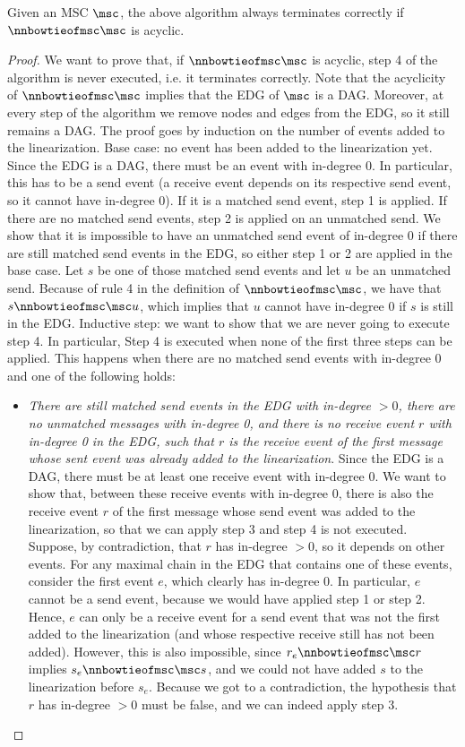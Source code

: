 \begin{proposition}
	Given an MSC $\msc$, the above algorithm always terminates correctly if $\nnbowtieofmsc\msc$ is acyclic.
\end{proposition}
\begin{proof}
We want to prove that, if $\nnbowtieofmsc\msc$ is acyclic, step 4 of the algorithm is never executed, i.e. it terminates correctly. Note that the acyclicity of $\nnbowtieofmsc\msc$ implies that the EDG of $\msc$ is a DAG. Moreover, at every step of the algorithm we remove nodes and edges from the EDG, so it still remains a DAG. The proof goes by induction on the number of events added to the linearization.\newline
Base case: no event has been added to the linearization yet. Since the EDG is a DAG, there must be an event with in-degree 0. In particular, this has to be a send event (a receive event depends on its respective send event, so it cannot have in-degree 0). If it is a matched send event, step 1 is applied. If there are no matched send events, step 2 is applied on an unmatched send. We show that it is impossible to have an unmatched send event of in-degree 0 if there are still matched send events in the EDG, so either step 1 or 2 are applied in the base case. Let $s$ be one of those matched send events and let $u$ be an unmatched send. Because of rule 4 in the definition of $\nnbowtieofmsc\msc$, we have that $s \nnbowtieofmsc\msc u$, which implies that $u$ cannot have in-degree 0 if $s$ is still in the EDG.\newline
Inductive step: we want to show that we are never going to execute step 4. In particular, Step 4 is executed when none of the first three steps can be applied. This happens when there are no matched send events with in-degree 0 and one of the following holds:
\begin{itemize}\itemsep=0.5ex
	\item \emph{There are still matched send events in the EDG with in-degree $>0$, there are no unmatched messages with in-degree 0, and there is no receive event $r$ with in-degree 0 in the EDG, such that $r$ is the receive event of the first message whose sent event was already added to the linearization}. Since the EDG is a DAG, there must be at least one receive event with in-degree 0. We want to show that, between these receive events with in-degree 0, there is also the receive event $r$ of the first message whose send event was added to the linearization, so that we can apply step 3 and step 4 is not executed. Suppose, by contradiction, that $r$ has in-degree $>0$, so it depends on other events. For any maximal chain in the EDG that contains one of these events, consider the first event $e$, which clearly has in-degree 0. In particular, $e$ cannot be a send event, because we would have applied step 1 or step 2. Hence, $e$ can only be a receive event for a send event that was not the first added to the linearization (and whose respective receive still has not been added). However, this is also impossible, since $r_e \nnbowtieofmsc\msc r$ implies $s_e \nnbowtieofmsc\msc s$, and we could not have added $s$ to the linearization before $s_e$. Because we got to a contradiction, the hypothesis that $r$ has in-degree $>0$ must be false, and we can indeed apply step 3.

\end{itemize}
\end{proof}
